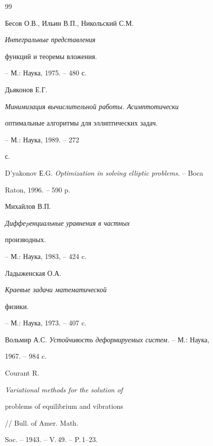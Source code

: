 \begin{thebibliography}{99}







Бесов О.В., Ильин В.П., Никольский С.М. {\em Интегральные представления


функций и теоремы вложения.} -- М.: Наука, 1975. -- 480 с.







Дьяконов Е.Г. {\em Минимизация вычислительной работы. Асимптотически


оптимальные алгоритмы для эллиптических задач.} -- М.: Наука, 1989. -- 272


с.







D'yakonov Е.G. {\em Optimization in solving elliptic problems.} -- Boca


Raton, 1996. -- 590 p.







Михайлов В.П. {\em Диффеpенциальные уравнения в частных


производных.} -- М.: Наука, 1983, -- 424 c.







Ладыженская О.А. {\em Краевые задачи математической


физики.} -- М.: Наука, 1973. -- 407 c.







Вольмир А.С. {\em Устойчивость деформируемых систем.} -- М.: Наука,


1967. -- 984 c.







Courant R. {\em Variational methods for the solution of


problems of equilibrium and vibrations} // Bull. of Amer. Math.


Soc. -- 1943. -- V.\,49. -- P.\,1--23.






\end{thebibliography}
